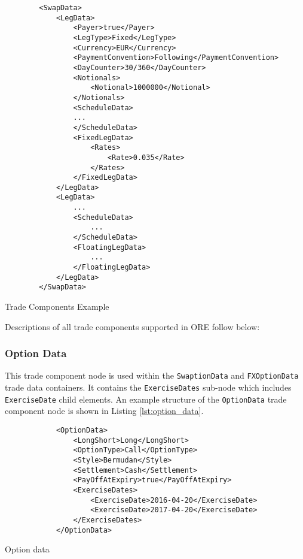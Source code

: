 \begin{listing}[H]
\begin{verbatim}
        <SwapData>
            <LegData>
                <Payer>true</Payer>
                <LegType>Fixed</LegType>
                <Currency>EUR</Currency>
                <PaymentConvention>Following</PaymentConvention>
                <DayCounter>30/360</DayCounter>
                <Notionals>
                    <Notional>1000000</Notional>
                </Notionals>
                <ScheduleData>
                ...
                </ScheduleData>
                <FixedLegData>
                    <Rates>
                        <Rate>0.035</Rate>
                    </Rates>
                </FixedLegData>
            </LegData>
            <LegData>
                ...
                <ScheduleData>
                    ...
                </ScheduleData>
                <FloatingLegData>
                    ...
                </FloatingLegData>
            </LegData>
        </SwapData>
\end{verbatim}
\caption{Trade Components Example}
\label{lst:trade_component}
\end{listing}

Descriptions of all trade components supported in ORE follow below:

\subsubsection{Option Data}
\label{ss:option_data} 
This trade component node is used within the \lstinline!SwaptionData! and \lstinline!FXOptionData! trade data
containers. It contains the \lstinline!ExerciseDates! sub-node which includes \lstinline!ExerciseDate! child
elements. An example structure of the \lstinline!OptionData! trade component node is shown in Listing
\ref{lst:option_data}.

\begin{listing}[H]
\begin{verbatim}
            <OptionData>
                <LongShort>Long</LongShort>
                <OptionType>Call</OptionType>
                <Style>Bermudan</Style>
                <Settlement>Cash</Settlement> 
                <PayOffAtExpiry>true</PayOffAtExpiry>
                <ExerciseDates>
                    <ExerciseDate>2016-04-20</ExerciseDate>
                    <ExerciseDate>2017-04-20</ExerciseDate>
                </ExerciseDates>
            </OptionData>
\end{verbatim}
\caption{Option data}
\label{lst:option_data}
\end{listing}

